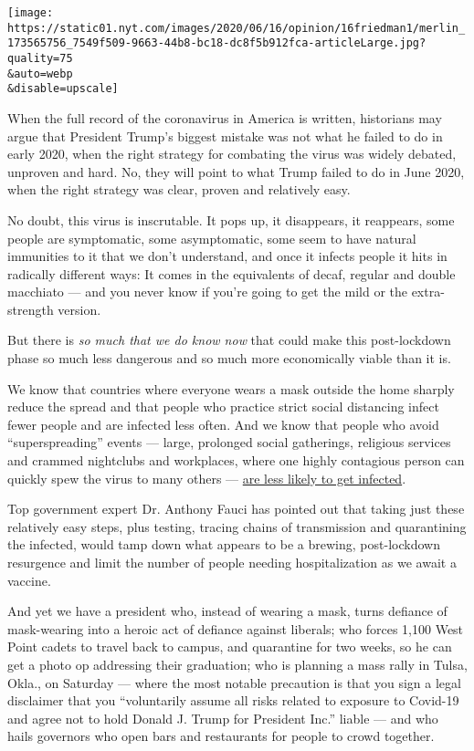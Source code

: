\texttt{[image: https://static01.nyt.com/images/2020/06/16/opinion/16friedman1/merlin\_173565756\_7549f509-9663-44b8-bc18-dc8f5b912fca-articleLarge.jpg?quality=75\\\&auto=webp\\\&disable=upscale]}

When the full record of the coronavirus in America is written,
historians may argue that President Trump's biggest mistake was not what
he failed to do in early 2020, when the right strategy for combating the
virus was widely debated, unproven and hard. No, they will point to what
Trump failed to do in June 2020, when the right strategy was clear,
proven and relatively easy.

No doubt, this virus is inscrutable. It pops up, it disappears, it
reappears, some people are symptomatic, some asymptomatic, some seem to
have natural immunities to it that we don't understand, and once it
infects people it hits in radically different ways: It comes in the
equivalents of decaf, regular and double macchiato --- and you never
know if you're going to get the mild or the extra-strength version.

But there is \emph{so much that we do know now} that could make this
post-lockdown phase so much less dangerous and so much more economically
viable than it is.

We know that countries where everyone wears a mask outside the home
sharply reduce the spread and that people who practice strict social
distancing infect fewer people and are infected less often. And we know
that people who avoid ``superspreading'' events --- large, prolonged
social gatherings, religious services and crammed nightclubs and
workplaces, where one highly contagious person can quickly spew the
virus to many others ---
\href{https://arstechnica.com/science/2020/06/just-10-20-of-covid-19-cases-behind-80-of-transmission-studies-suggest/}{are
less likely to get infected}.

Top government expert Dr. Anthony Fauci has pointed out that taking just
these relatively easy steps, plus testing, tracing chains of
transmission and quarantining the infected, would tamp down what appears
to be a brewing, post-lockdown resurgence and limit the number of people
needing hospitalization as we await a vaccine.

And yet we have a president who, instead of wearing a mask, turns
defiance of mask-wearing into a heroic act of defiance against liberals;
who forces 1,100 West Point cadets to travel back to campus, and
quarantine for two weeks, so he can get a photo op addressing their
graduation; who is planning a mass rally in Tulsa, Okla., on Saturday
--- where the most notable precaution is that you sign a legal
disclaimer that you ``voluntarily assume all risks related to exposure
to Covid-19 and agree not to hold Donald J. Trump for President Inc.''
liable --- and who hails governors who open bars and restaurants for
people to crowd together.

